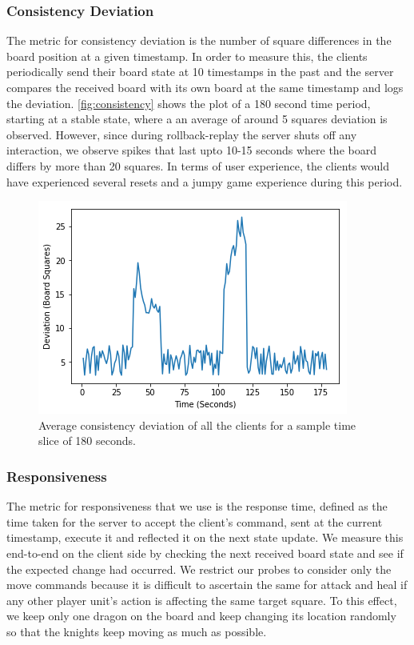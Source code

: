 \documentclass[a4paper]{IEEEtran}
\begin{document}
  \subsubsection{Consistency Deviation}

  The metric for consistency deviation is the number of square differences in the board position at a given timestamp. In order to measure this, the clients periodically send their board state at 10 timestamps in the past and the server compares the received board with its own board at the same timestamp and logs the deviation. \autoref{fig:consistency} shows the plot of a 180 second time period, starting at a stable state, where a an average of around 5 squares deviation is observed. However, since during rollback-replay the server shuts off any interaction, we observe spikes that last upto 10-15 seconds where the board differs by more than 20 squares. In terms of user experience, the clients would have experienced several resets and a jumpy game experience during this period.

  \begin{figure}[tbp]
    \centering
      \includegraphics[width=\columnwidth]{consistency}
    \caption{Average consistency deviation of all the clients for a sample time slice of 180 seconds.}
    \label{fig:consistency}
  \end{figure} 

  \subsubsection{Responsiveness}

  The metric for responsiveness that we use is the response time, defined as the time taken for the server to accept the client's command, sent at the current timestamp, execute it and reflected it on the next state update. We measure this end-to-end on the client side by checking the next received board state and see if the expected change had occurred. We restrict our probes to consider only the move commands because it is difficult to ascertain the same for attack and heal if any other player unit's action is affecting the same target square. To this effect, we keep only one dragon on the board and keep changing its location randomly so that the knights keep moving as much as possible.
\end{document}
